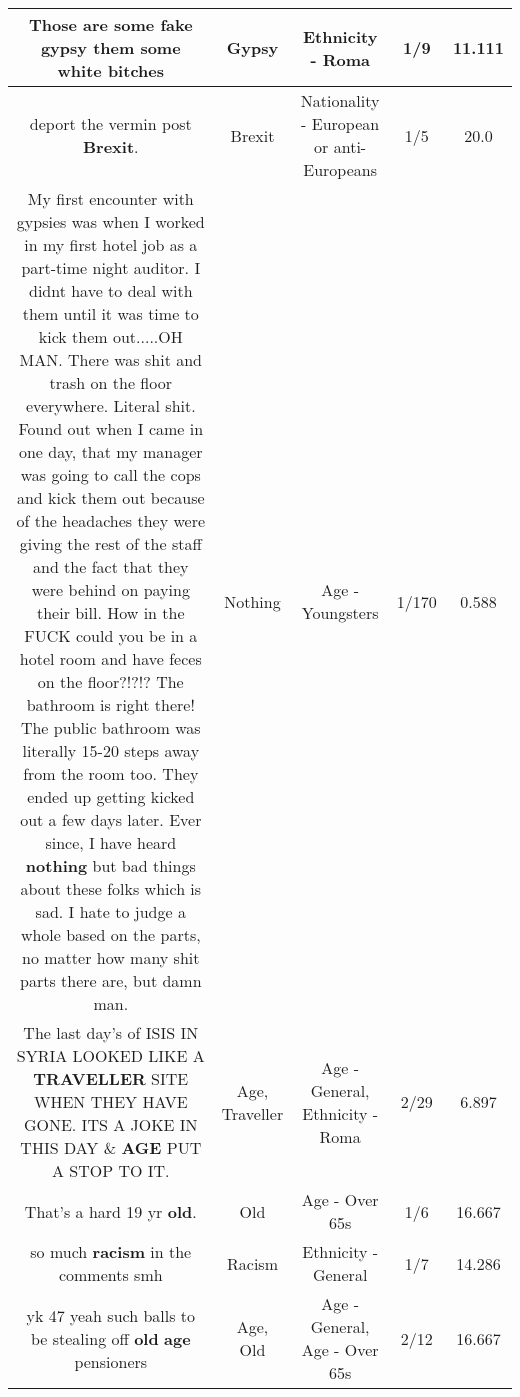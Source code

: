 \documentclass[11pt]{article}
\newlength\mylength
\begin{document}
\begin{center}
\begin{longtable}{|C{.65\mylength}|C{.30\mylength}|C{.12\mylength}|C{.12\mylength}|C{.12\mylength}|}
  \small Those are some fake \textbf{gypsy} them some white bitches\normalsize   & Gypsy & Ethnicity - Roma & 1/9 & 11.111 \\  \hline
  \small deport the vermin post \textbf{Brexit}.\normalsize   & Brexit & Nationality - European or anti-Europeans & 1/5 & 20.0 \\  \hline
  \small My first encounter with gypsies was when I worked in my first hotel job as a part-time night auditor. I didnt have to deal with them until it was time to kick them out.....OH MAN. There was shit and trash on the floor everywhere. Literal shit. Found out when I came in one day, that my manager was going to call the cops and kick them out because of the headaches they were giving the rest of the staff and the fact that they were behind on paying their bill. How in the FUCK could you be in a hotel room and have feces on the floor?!?!? The bathroom is right there! The public bathroom was literally 15-20 steps away from the room too. They ended up getting kicked out a few days later. Ever since, I have heard \textbf{nothing} but bad things about these folks which is sad. I hate to judge a whole based on the parts, no matter how many shit parts there are, but damn man.\normalsize   & Nothing & Age - Youngsters & 1/170 & 0.588 \\  \hline
  \small The last day's of  ISIS IN SYRIA  LOOKED  LIKE A \textbf{TRAVELLER} SITE  WHEN THEY HAVE  GONE. ITS  A JOKE IN THIS DAY  \& \textbf{AGE} PUT A  STOP TO IT.\normalsize   & Age, Traveller & Age - General, Ethnicity - Roma & 2/29 & 6.897 \\  \hline
  \small That's a hard 19 yr \textbf{old}.\normalsize   & Old & Age - Over 65s & 1/6 & 16.667 \\  \hline
  \small so much \textbf{racism} in the comments smh\normalsize   & Racism & Ethnicity - General & 1/7 & 14.286 \\  \hline
  \small yk 47 yeah such balls to be stealing off \textbf{old} \textbf{age} pensioners\normalsize   & Age, Old & Age - General, Age - Over 65s & 2/12 & 16.667 \\  \hline

\end{longtable}
\end{center}
\end{document}
